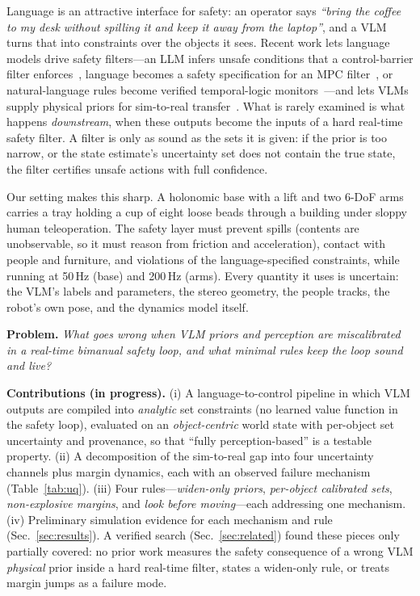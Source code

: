 \documentclass[10pt,twocolumn,letterpaper]{article}
\begin{document}
Language is an attractive interface for safety: an operator says \emph{``bring the coffee to my desk without spilling it and keep it away
from the laptop''}, and a VLM turns that into constraints over the objects it sees. Recent work lets language models drive safety filters---an LLM infers unsafe conditions that a control-barrier filter enforces~\cite{brunke2025}, language becomes a safety specification for an MPC filter~\cite{feng2025}, or natural-language rules become verified temporal-logic monitors~\cite{safetychip}---and lets VLMs supply physical priors for sim-to-real transfer~\cite{phys2real,peng2025}.
What is rarely examined is what happens \emph{downstream}, when these outputs become the inputs of a hard real-time safety filter.
A filter is only as sound as the sets it is given: if the prior is too narrow, or the state estimate's uncertainty set does not contain
the true state, the filter certifies unsafe actions with full confidence.

Our setting makes this sharp. A holonomic base with a lift and two 6-DoF arms carries a tray holding a cup of eight loose beads through
a building under sloppy human teleoperation. The safety layer must prevent spills (contents are unobservable, so it must reason from
friction and acceleration), contact with people and furniture, and violations of the language-specified constraints, while running at
50\,Hz (base) and 200\,Hz (arms). Every quantity it uses is uncertain: the VLM's labels and parameters, the stereo geometry, the people
tracks, the robot's own pose, and the dynamics model itself.

\textbf{Problem.} \emph{What goes wrong when VLM priors and perception are miscalibrated in a real-time bimanual safety loop, and what
minimal rules keep the loop sound and live?}

\textbf{Contributions (in progress).}
(i) A language-to-control pipeline in which VLM outputs are compiled into \emph{analytic} set constraints (no learned value function in
the safety loop), evaluated on an \emph{object-centric} world state with per-object set uncertainty and provenance, so that ``fully
perception-based'' is a testable property.
(ii) A decomposition of the sim-to-real gap into four uncertainty channels plus margin dynamics, each with an observed failure mechanism
(Table~\ref{tab:uq}).
(iii) Four rules---\emph{widen-only priors}, \emph{per-object calibrated sets}, \emph{non-explosive margins}, and \emph{look before
moving}---each addressing one mechanism.
(iv) Preliminary simulation evidence for each mechanism and rule (Sec.~\ref{sec:results}). A verified search (Sec.~\ref{sec:related}) found these pieces only partially covered: no prior work measures the safety consequence of a wrong VLM \emph{physical} prior inside a hard real-time filter, states a widen-only rule, or treats margin jumps as a failure mode.
\end{document}
